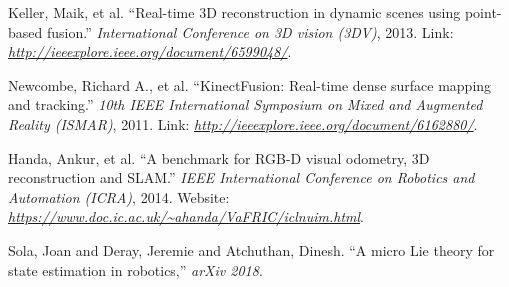 \documentclass[12pt, a4paper]{article}
\begin{document}
\begin{thebibliography}{1}
 Keller, Maik, et al. ``Real-time 3D reconstruction
in dynamic scenes using point-based fusion.'' \emph{International
Conference on 3D vision (3DV)}, 2013. Link: \label{PBF}\emph{\uline{http://ieeexplore.ieee.org/document/6599048/}}. 

 Newcombe, Richard A., et al. ``KinectFusion: Real-time
dense surface mapping and tracking.'' \emph{10th IEEE International
Symposium on Mixed and Augmented Reality (ISMAR)}, 2011. Link: \label{KF}\emph{\uline{http://ieeexplore.ieee.org/document/6162880/}}. 

 Handa, Ankur, et al. ``A benchmark for RGB-D
visual odometry, 3D reconstruction and SLAM.'' \emph{IEEE International
Conference on Robotics and Automation (ICRA)}, 2014. Website: \label{ICL_NUIM}\emph{\uline{https://www.doc.ic.ac.uk/\textasciitilde{}ahanda/VaFRIC/iclnuim.html}}.

  Sola, Joan and Deray, Jeremie and Atchuthan, Dinesh.
  ``A micro Lie theory for state estimation in robotics,'' \emph{arXiv 2018}.
\end{thebibliography}
\end{document}
